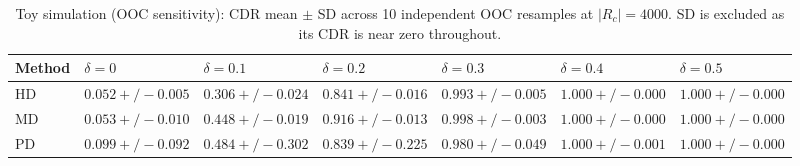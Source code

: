 \begin{table}[htbp]
\centering
\caption{Toy simulation (OOC sensitivity): CDR mean $\pm$ SD
across 10 independent OOC resamples at $|R_c|=4000$.
SD is excluded as its CDR is near zero throughout.}
\label{tab:toy-sensitivity}
\small
\begin{tabular}{l l l l l l l}
\toprule
Method & {$\delta=0$} & {$\delta=0.1$} & {$\delta=0.2$} & {$\delta=0.3$} & {$\delta=0.4$} & {$\delta=0.5$} \\
\midrule
  HD & $0.052 +/- 0.005$ & $0.306 +/- 0.024$ & $0.841 +/- 0.016$ & $0.993 +/- 0.005$ & $1.000 +/- 0.000$ & $1.000 +/- 0.000$ \\
  MD & $0.053 +/- 0.010$ & $0.448 +/- 0.019$ & $0.916 +/- 0.013$ & $0.998 +/- 0.003$ & $1.000 +/- 0.000$ & $1.000 +/- 0.000$ \\
  PD & $0.099 +/- 0.092$ & $0.484 +/- 0.302$ & $0.839 +/- 0.225$ & $0.980 +/- 0.049$ & $1.000 +/- 0.001$ & $1.000 +/- 0.000$ \\
\bottomrule
\end{tabular}
\end{table}
